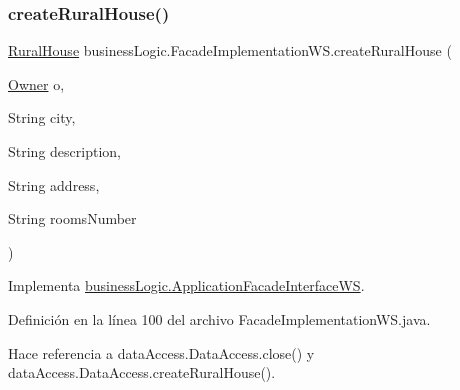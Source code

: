 \subsubsection{\texorpdfstring{createRuralHouse()}{createRuralHouse()}}
{\footnotesize\ttfamily \mbox{\hyperlink{classdomain_1_1_rural_house}{Rural\+House}} business\+Logic.\+Facade\+Implementation\+W\+S.\+create\+Rural\+House (\begin{DoxyParamCaption}\item[{\mbox{\hyperlink{classdomain_1_1_owner}{Owner}}}]{o,  }\item[{String}]{city,  }\item[{String}]{description,  }\item[{String}]{address,  }\item[{String}]{rooms\+Number }\end{DoxyParamCaption})}



Implementa \mbox{\hyperlink{interfacebusiness_logic_1_1_application_facade_interface_w_s_a624b00ae79c85436420d62cf34a082d7}{business\+Logic.\+Application\+Facade\+Interface\+WS}}.



Definición en la línea 100 del archivo Facade\+Implementation\+W\+S.\+java.


\begin{DoxyCode}{0}

\end{DoxyCode}


Hace referencia a data\+Access.\+Data\+Access.\+close() y data\+Access.\+Data\+Access.\+create\+Rural\+House().

\mbox{\label{classbusiness_logic_1_1_facade_implementation_w_s_aa6f21ddb40ca6cd752a13e31ff016e7e}} 
